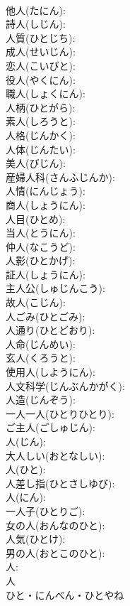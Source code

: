 \documentclass[8pt]{extreport}
\begin{document}
\begin{CJK}{UTF8}{min}
\\	他人(たにん): 
\\	詩人(しじん): 
\\	人質(ひとじち): 
\\	成人(せいじん): 
\\	恋人(こいびと): 
\\	役人(やくにん): 
\\	職人(しょくにん): 
\\	人柄(ひとがら): 
\\	素人(しろうと): 
\\	人格(じんかく): 
\\	人体(じんたい): 
\\	美人(びじん): 
\\	産婦人科(さんふじんか): 
\\	人情(にんじょう): 
\\	商人(しょうにん): 
\\	人目(ひとめ): 
\\	当人(とうにん): 
\\	仲人(なこうど): 
\\	人影(ひとかげ): 
\\	証人(しょうにん): 
\\	主人公(しゅじんこう): 
\\	故人(こじん): 
\\	人ごみ(ひとごみ): 
\\	人通り(ひとどおり): 
\\	人命(じんめい): 
\\	玄人(くろうと): 
\\	使用人(しようにん): 
\\	人文科学(じんぶんかがく): 
\\	人造(じんぞう): 
\\	一人一人(ひとりひとり): 
\\	ご主人(ごしゅじん): 
\\	人(じん): 
\\	大人しい(おとなしい): 
\\	人(ひと): 
\\	人差し指(ひとさしゆび): 
\\	人(にん): 
\\	一人子(ひとりご): 
\\	女の人(おんなのひと): 
\\	人気(ひとけ): 
\\	男の人(おとこのひと): 
\\	人: 
\\	人	
\\	ひと・にんべん・ひとやね	

\end{CJK}
\end{document}
